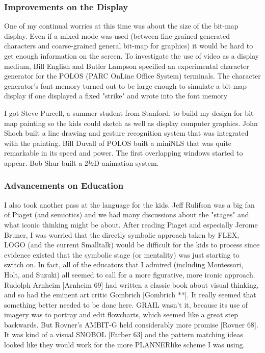 \documentclass[letterpaper,12pt,parskip=full]{article}
\begin{document}
\subsubsection{Improvements on the Display}

One of my continual worries at this time was about the size of the bit-map display. Even if a mixed mode was used (between fine-grained generated characters and coarse-grained general bit-map for graphics) it would be hard to get enough information on the screen. To investigate the use of video as a display medium, Bill English and Butler Lampson specified an experimental character generator for the POLOS (PARC OnLine Office System) terminals. The character generator's font memory turned out to be large enough to simulate a bit-map display if one displayed a fixed "strike" and wrote into the font memory

I got Steve Purcell, a summer student from Stanford, to build my design for bit-map painting so the kids could sketch as well as display computer graphics. John Shoch built a line drawing and gesture recognition system that was integrated with the painting. Bill Duvall of POLOS built a miniNLS that was quite remarkable in its speed and power. The first overlapping windows started to appear. Bob Shur built a 2½D animation system.

\subsubsection{Advancements on Education}

I also took another pass at the language for the kids. Jeff Rulifson was a big fan of Piaget (and semiotics) and we had many discussions about the "stages" and what iconic thinking might be about. After reading Piaget and especially Jerome Bruner, I was worried that the directly symbolic approach taken by FLEX, LOGO (and the current Smalltalk) would be difficult for the kids to process since evidence existed that the symbolic stage (or mentality) was just starting to switch on. In fact, all of the educators that I admired (including Montessori, Holt, and Suzuki) all seemed to call for a more figurative, more iconic approach. Rudolph Arnheim [Arnheim 69] had written a classic book about visual thinking, and so had the eminent art critic Gombrich [Gombrich **]. It really seemed that something better needed to be done here. GRAIL wasn't it, because its use of imagery was to portray and edit flowcharts, which seemed like a great step backwards. But Rovner's AMBIT-G held considerably more promise [Rovner 68]. It was kind of a visual SNOBOL [Farber 63] and the pattern matching ideas looked like they would work for the more PLANNERlike scheme I was using.
\end{document}
